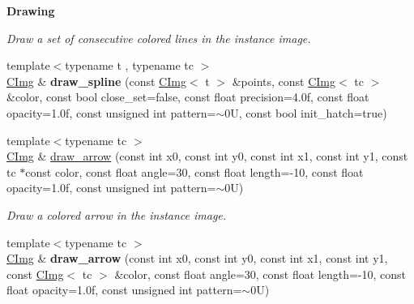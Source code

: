 \begin{Indent}{\bf Drawing}
\begin{DoxyCompactItemize}
\begin{DoxyCompactList}\small\item\em Draw a set of consecutive colored lines in the instance image. \end{DoxyCompactList}\item 
\hypertarget{structcimg__library_1_1_c_img_aed77ad94e0caca6a596c76bc0013f321}{{\footnotesize template$<$typename t , typename tc $>$ }\\\hyperlink{structcimg__library_1_1_c_img}{C\-Img} \& {\bfseries draw\-\_\-spline} (const \hyperlink{structcimg__library_1_1_c_img}{C\-Img}$<$ t $>$ \&points, const \hyperlink{structcimg__library_1_1_c_img}{C\-Img}$<$ tc $>$ \&color, const bool close\-\_\-set=false, const float precision=4.\-0f, const float opacity=1.\-0f, const unsigned int pattern=$\sim$0\-U, const bool init\-\_\-hatch=true)}\label{structcimg__library_1_1_c_img_aed77ad94e0caca6a596c76bc0013f321}

\item 
{\footnotesize template$<$typename tc $>$ }\\\hyperlink{structcimg__library_1_1_c_img}{C\-Img} \& \hyperlink{structcimg__library_1_1_c_img_af7338f1daed2c68dd0481944c55a99ac}{draw\-\_\-arrow} (const int x0, const int y0, const int x1, const int y1, const tc $\ast$const color, const float angle=30, const float length=-\/10, const float opacity=1.\-0f, const unsigned int pattern=$\sim$0\-U)
\begin{DoxyCompactList}\small\item\em Draw a colored arrow in the instance image. \end{DoxyCompactList}\item 
\hypertarget{structcimg__library_1_1_c_img_ac5b2bc3e214c810e41a9101bf7a04da1}{{\footnotesize template$<$typename tc $>$ }\\\hyperlink{structcimg__library_1_1_c_img}{C\-Img} \& {\bfseries draw\-\_\-arrow} (const int x0, const int y0, const int x1, const int y1, const \hyperlink{structcimg__library_1_1_c_img}{C\-Img}$<$ tc $>$ \&color, const float angle=30, const float length=-\/10, const float opacity=1.\-0f, const unsigned int pattern=$\sim$0\-U)}\label{structcimg__library_1_1_c_img_ac5b2bc3e214c810e41a9101bf7a04da1}


\end{DoxyCompactItemize}
\end{Indent}
